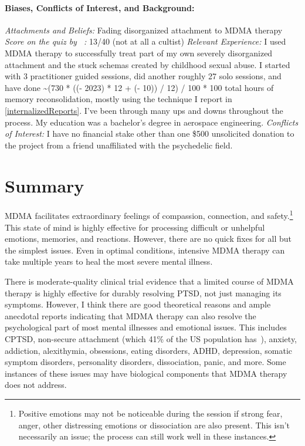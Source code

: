 \documentclass[11pt,oneside]{book}
\let\cite\parencite
\newcommand{\prosecite}[1]{\citetitle{#1} by \citefullauthor{#1}~\cite{#1}}
\newcommand{\reconsolidationhours}{\the\numexpr (730 * ((\year - 2023) * 12 + (\month - 10)) / 12) / 100 * 100 \relax{}}
\begin{document}
\subsubsection*{Biases, Conflicts of Interest, and Background:}
\textit{Attachments and Beliefs:} Fading disorganized attachment to MDMA therapy
\textit{Score on the quiz \prosecite{cultistQuiz}:} 13/40 (not at all a cultist)
\textit{Relevant Experience:} I used MDMA therapy to successfully treat part of my own severely disorganized attachment and the stuck schemas created by childhood sexual abuse. I started with 3 practitioner guided sessions, did another roughly 27 solo sessions, and have done \textasciitilde\reconsolidationhours{} total hours of memory reconsolidation, mostly using the technique I report in \cref{internalizedReports}. I've been through many ups and downs throughout the process. My education was a bachelor's degree in aerospace engineering.
\textit{Conflicts of Interest:} I have no financial stake other than one \$500 unsolicited donation to the project from a friend unaffiliated with the psychedelic field.

\mainmatter

\chapter{Summary}
\label{summary}
MDMA facilitates extraordinary feelings of compassion, connection, and safety.\footnote{Positive emotions may not be noticeable during the session if strong fear, anger, other distressing emotions or dissociation are also present. This isn't necessarily an issue; the process can still work well in these instances.} This state of mind is highly effective for processing difficult or unhelpful emotions, memories, and reactions. However, there are no quick fixes for all but the simplest issues. Even in optimal conditions, intensive MDMA therapy can take multiple years to heal the most severe mental illness.

There is moderate-quality clinical trial evidence that a limited course of MDMA therapy is highly effective for durably resolving PTSD, not just managing its symptoms. However, I think there are good theoretical reasons and ample anecdotal reports indicating that MDMA therapy can also resolve the psychological part of most mental illnesses and emotional issues. This includes CPTSD, non-secure attachment (which 41\% of the US population has~\cite{mickelson1997adult}), anxiety, addiction, alexithymia, obsessions, eating disorders, ADHD, depression, somatic symptom disorders, personality disorders, dissociation, panic, and more. Some instances of these issues may have biological components that MDMA therapy does not address.
\end{document}
